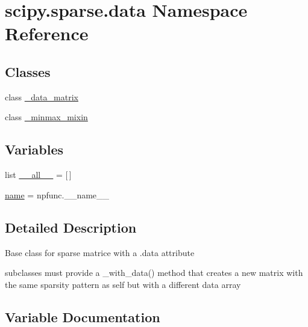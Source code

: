 \hypertarget{namespacescipy_1_1sparse_1_1data}{}\section{scipy.\+sparse.\+data Namespace Reference}
\label{namespacescipy_1_1sparse_1_1data}
\subsection*{Classes}
\begin{DoxyCompactItemize}
\item 
class \hyperlink{classscipy_1_1sparse_1_1data_1_1__data__matrix}{\+\_\+data\+\_\+matrix}
\item 
class \hyperlink{classscipy_1_1sparse_1_1data_1_1__minmax__mixin}{\+\_\+minmax\+\_\+mixin}
\end{DoxyCompactItemize}
\subsection*{Variables}
\begin{DoxyCompactItemize}
\item 
list \hyperlink{namespacescipy_1_1sparse_1_1data_af9611781075f5399d32f20f06b874517}{\+\_\+\+\_\+all\+\_\+\+\_\+} = \mbox{[}$\,$\mbox{]}
\item 
\hyperlink{namespacescipy_1_1sparse_1_1data_a6cc16441add0089b6cd0328494ca7e7a}{name} = npfunc.\+\_\+\+\_\+name\+\_\+\+\_\+
\end{DoxyCompactItemize}


\subsection{Detailed Description}
\begin{DoxyVerb}Base class for sparse matrice with a .data attribute

    subclasses must provide a _with_data() method that
    creates a new matrix with the same sparsity pattern
    as self but with a different data array\end{DoxyVerb}
 

\subsection{Variable Documentation}
\hypertarget{namespacescipy_1_1sparse_1_1data_af9611781075f5399d32f20f06b874517}{}

